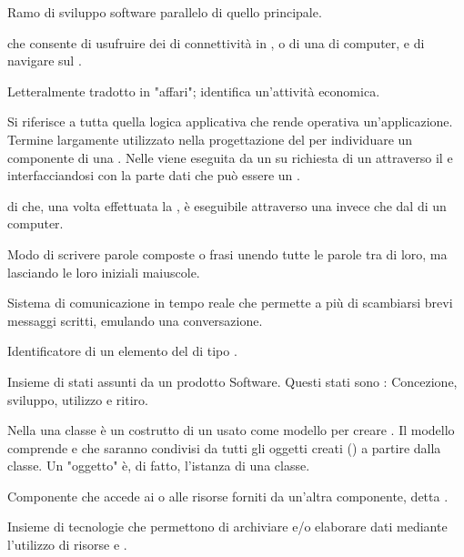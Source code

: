 {Ramo di sviluppo software parallelo di quello principale.}

{ che consente di usufruire dei  di connettività in , o di una  di computer, e di navigare sul .}

{Letteralmente tradotto in "affari"; identifica un'attività economica.}

{Si riferisce a tutta quella logica applicativa che rende operativa un'applicazione. Termine largamente utilizzato nella progettazione del  per individuare un componente di una . Nelle  viene eseguita da un  su richiesta di un  attraverso il  e interfacciandosi con la parte dati che può essere un .}

{ di  che, una volta effettuata la , è eseguibile attraverso una  invece che dal  di un computer.}




{Modo di scrivere parole composte o frasi unendo tutte le parole tra di loro, ma lasciando le loro iniziali maiuscole.}

{Sistema di comunicazione in tempo reale che permette a più  di scambiarsi brevi messaggi scritti, emulando una conversazione.}

{Identificatore di un elemento del  di tipo .}

{Insieme di stati assunti da un prodotto Software. Questi stati sono : Concezione, sviluppo, utilizzo e ritiro.}

{Nella   una classe è un costrutto di un  usato come modello per creare . Il modello comprende  e  che saranno condivisi da tutti gli oggetti creati () a partire dalla classe. Un "oggetto" è, di fatto, l'istanza di una classe.}

{Componente che accede ai  o alle risorse forniti da un'altra componente, detta .} 

{Insieme di tecnologie che permettono di archiviare e/o elaborare dati mediante l'utilizzo di risorse  e  .}

